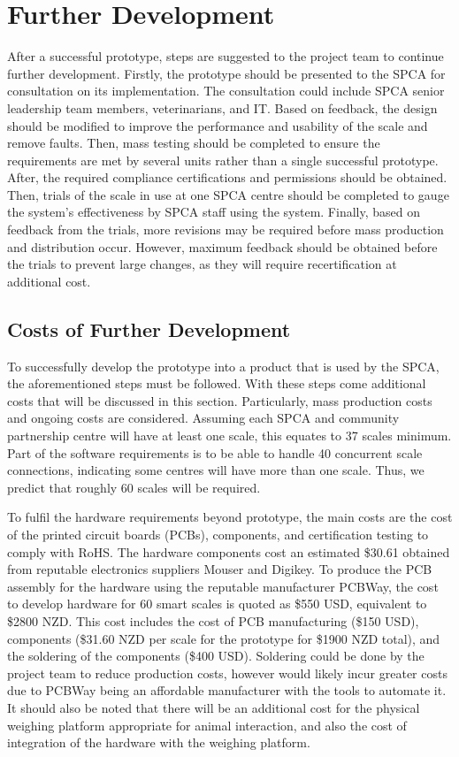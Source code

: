 \section{Further Development}

After a successful prototype, steps are suggested to the project team to continue further development. Firstly, the prototype should be presented to the SPCA for consultation on its implementation. The consultation could include SPCA senior leadership team members, veterinarians, and IT. Based on feedback, the design should be modified to improve the performance and usability of the scale and remove faults. Then, mass testing should be completed to ensure the requirements are met by several units rather than a single successful prototype. After, the required compliance certifications and permissions should be obtained. Then, trials of the scale in use at one SPCA centre should be completed to gauge the system’s effectiveness by SPCA staff using the system. Finally, based on feedback from the trials, more revisions may be required before mass production and distribution occur. However, maximum feedback should be obtained before the trials to prevent large changes, as they will require recertification at additional cost.


\subsection{Costs of Further Development}

To successfully develop the prototype into a product that is used by the SPCA, the aforementioned steps must be followed. With these steps come additional costs that will be discussed in this section. Particularly, mass production costs and ongoing costs are considered. Assuming each SPCA and community partnership centre will have at least one scale, this equates to 37 scales minimum. Part of the software requirements is to be able to handle 40 concurrent scale connections, indicating some centres will have more than one scale. Thus, we predict that roughly 60 scales will be required.

To fulfil the hardware requirements beyond prototype, the main costs are the cost of the printed circuit boards (PCBs), components, and certification testing to comply with RoHS. The hardware components cost an estimated \$30.61 obtained from reputable electronics suppliers Mouser and Digikey. To produce the PCB assembly for the hardware using the reputable manufacturer PCBWay, the cost to develop hardware for 60 smart scales is quoted as \$550 USD, equivalent to \$2800 NZD. This cost includes the cost of PCB manufacturing (\$150 USD), components (\$31.60 NZD per scale for the prototype for \$1900 NZD total), and the soldering of the components (\$400 USD). Soldering could be done by the project team to reduce production costs, however would likely incur greater costs due to PCBWay being an affordable manufacturer with the tools to automate it. It should also be noted that there will be an additional cost for the physical weighing platform appropriate for animal interaction, and also the cost of integration of the hardware with the weighing platform. 

